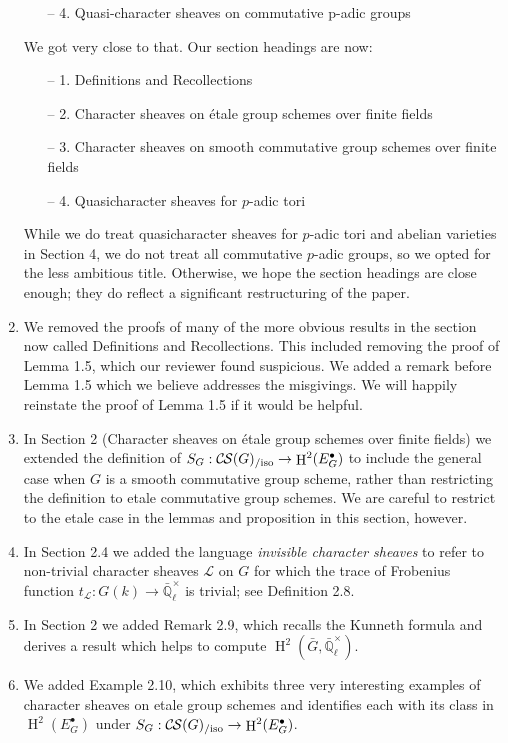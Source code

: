 \documentclass[a4, 10pt]{amsart}
\theoremstyle{definition}
\theoremstyle{remark}
\newcommand{\EE}{\mathbb{\bar Q}_\ell}
\newcommand{\EEx}{\EE^\times}
\DeclareMathOperator{\Hh}{H}
\newcommand{\CS}{{\mathcal{C\hskip-0.8pt S}}}
\newcommand{\CSiso}[1]{\CS(#1)_{/\text{iso}}}
\begin{document}
\begin{enumerate}
\begin{enumerate}
\item[– 4.] Quasi-character sheaves on commutative p-adic groups
\end{enumerate}
We got very close to that. Our section headings are now:
\begin{enumerate}
\item[– 1.] Definitions and Recollections 
\item[– 2.] Character sheaves on \'etale group schemes over finite fields
\item[– 3.] Character sheaves on smooth commutative group schemes over finite fields
\item[– 4.] Quasicharacter sheaves for $p$-adic tori
\end{enumerate}
While we do treat quasicharacter sheaves for $p$-adic tori and abelian varieties in Section 4, we do not treat all commutative $p$-adic groups, so we opted for the less ambitious title. Otherwise, we hope the section headings are close enough; they do reflect a significant restructuring of the paper.
\item
We removed the proofs of many of the more obvious results in the section now called Definitions and Recollections. 
This included removing the proof of Lemma 1.5, which our reviewer found suspicious. We added a remark before Lemma 1.5 which we believe addresses the misgivings. We will happily reinstate the proof of Lemma 1.5 if it would be helpful.
\item
In Section 2 (Character sheaves on \'etale group schemes over finite fields) we extended the definition of $S_G : \CSiso{G} \to \Hh^2(E^\bullet_G)$ to include the general case when $G$ is a smooth commutative group scheme, rather than restricting the definition to etale commutative group schemes. We are careful to restrict to the etale case in the lemmas and proposition in this section, however.
\item
In Section 2.4 we added the language {\it invisible character sheaves} to refer to non-trivial character sheaves $\mathcal{L}$ on $G$ for which the trace of Frobenius function $t_\mathcal{L} : G(k) \to \EEx$ is trivial; see Definition 2.8.
\item
In Section 2 we added Remark 2.9, which recalls the Kunneth formula and derives a result which helps to compute $\Hh^2({\bar G}, \EEx)$.
\item 
We added Example 2.10, which exhibits three very interesting examples of character sheaves on etale group schemes and identifies each with its class in $\Hh^2(E_G^\bullet)$ under $S_G : \CSiso{G} \to \Hh^2(E^\bullet_G)$.

\end{enumerate}
\end{document}
